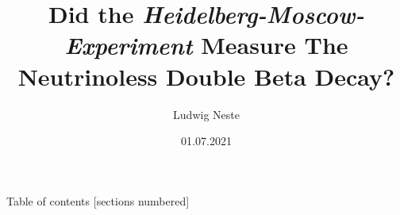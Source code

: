

\title{Did the \emph{Heidelberg-Moscow-Experiment} Measure The Neutrinoless Double Beta Decay?}
\date{01.07.2021}
\author{Ludwig Neste}



\begin{frame}
	\titlepage
\end{frame}
\begin{frame}{Table of contents}
	[sections numbered]
	\tableofcontents[hideallsubsections]
\end{frame}








